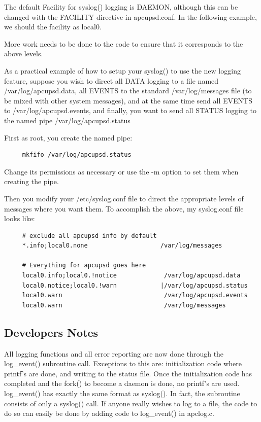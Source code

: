 {{{{{{{The default Facility for syslog() logging is DAEMON, although this can be
changed with the FACILITY directive in apcupsd.conf. In the following example,
we should the facility as local0.  

More work needs to be done to the code to ensure that it corresponds to the
above levels.  

As a practical example of how to setup your syslog() to use the new logging
feature, suppose you wish to direct all DATA logging to a file named
/var/log/apcupsd.data, all EVENTS to the standard /var/log/messages file (to
be mixed with other system messages), and at the same time send all EVENTS to
/var/log/apcupsd.events, and finally, you want to send all STATUS logging to
the named pipe /var/log/apcupsd.status  

First as root, you create the named pipe: 

\footnotesize
\begin{verbatim}
     mkfifo /var/log/apcupsd.status
\end{verbatim}
\normalsize

Change its permissions as necessary or use the -m option to set them when
creating the pipe.  

Then you modify your /etc/syslog.conf file to direct the appropriate levels of
messages where you want them. To accomplish the above, my syslog.conf file
looks like: 

\footnotesize
\begin{verbatim}
     # exclude all apcupsd info by default
     *.info;local0.none                    /var/log/messages
     
     # Everything for apcupsd goes here
     local0.info;local0.!notice             /var/log/apcupsd.data
     local0.notice;local0.!warn            |/var/log/apcupsd.status
     local0.warn                            /var/log/apcupsd.events
     local0.warn                            /var/log/messages
\end{verbatim}
\normalsize

\label{Developers-Notes}

\subsection*{Developers Notes}

\label{index-Developers-Notes-169}
All logging functions and all error reporting are now done through the
log\_event() subroutine call. Exceptions to this are: initialization code
where printf's are done, and writing to the status file. Once the
initialization code has completed and the fork() to become a daemon is done,
no printf's are used. log\_event() has exactly the same format as syslog(). In
fact, the subroutine consists of only a syslog() call. If anyone really wishes
to log to a file, the code to do so can easily be done by adding code to
log\_event() in apclog.c. 


}}}}}}}
